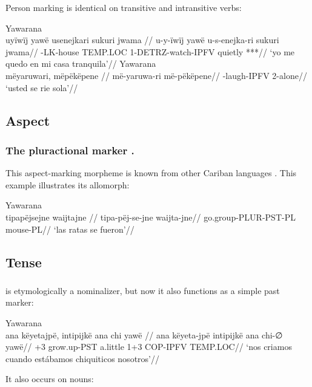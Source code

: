 \documentclass{article}
\begin{document}
Person marking is identical on transitive and intransitive verbs:

\pex
{} Yawarana\\
\begingl
\glpreamble  uyïwïj yawë usenejkari sukuri jwama //
\gla u-y-ïwïj yawë u-s-enejka-ri sukuri jwama//
-LK-house TEMP.LOC 1-DETRZ-watch-IPFV quietly ***//
\glft ‘yo me quedo en mi casa tranquila’//  
\endgl 
{} Yawarana\\
\begingl
\glpreamble  mëyaruwari, mëpëkëpene //
\gla më-yaruwa-ri më-pëkëpene//
-laugh-IPFV 2-alone//
\glft ‘usted se rie sola’//  
\endgl 
\xe

\subsection{Aspect}

\subsubsection{The pluractional marker .}

This aspect-marking morpheme is known from other Cariban languages
\parencite{mattiola2020pluractional}. This example illustrates its
 allomorph:

 Yawarana \\
\begingl
\glpreamble  tipapëjsejne waijtajne //
\gla tipa-pëj-se-jne waijta-jne//
\glb go.group-PLUR-PST-PL mouse-PL//
\glft ‘las ratas se fueron’//  
\endgl 
\xe

\subsection{Tense}

\subsubsection{}

 is etymologically a nominalizer, but now it also functions as
a simple past marker:

 Yawarana \\
\begingl
\glpreamble  ana këyetajpë, intipijkë ana chi yawë //
\gla ana këyeta-jpë intipijkë ana chi-∅ yawë//
+3 grow.up-PST a.little 1+3 COP-IPFV TEMP.LOC//
\glft ‘nos criamos cuando estábamos chiquiticos nosotros’//  
\endgl 
\xe

It also occurs on nouns:
\end{document}
